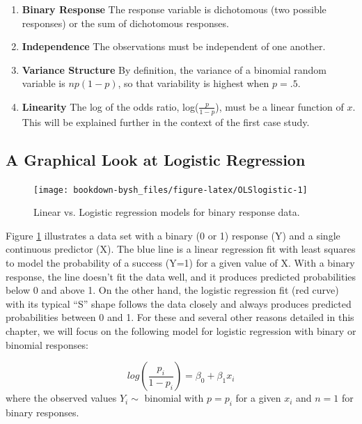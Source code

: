 \documentclass[
]{krantz}
\providecommand{\tightlist}{%
  \setlength{\itemsep}{0pt}\setlength{\parskip}{0pt}}
\begin{document}
\begin{enumerate}
\def\labelenumi{\arabic{enumi}.}
\tightlist
\item
  \textbf{Binary Response} The response variable is dichotomous (two possible responses) or the sum of dichotomous responses.
\item
  \textbf{Independence} The observations must be independent of one another.
\item
  \textbf{Variance Structure} By definition, the variance of a binomial random variable is \(np(1-p)\), so that variability is highest when \(p=.5\).
\item
  \textbf{Linearity} The log of the odds ratio, log(\(\frac{p}{1-p}\)), must be a linear function of \(x\). This will be explained further in the context of the first case study.
\end{enumerate}

\hypertarget{a-graphical-look-at-logistic-regression}{%
\subsection{A Graphical Look at Logistic Regression}\label{a-graphical-look-at-logistic-regression}}

\begin{figure}

{\centering \texttt{[image: bookdown-bysh\_files/figure-latex/OLSlogistic-1]} 

}

\caption{Linear vs. Logistic regression models for binary response data.}\label{fig:OLSlogistic}
\end{figure}

Figure \ref{fig:OLSlogistic} illustrates a data set with a binary (0 or 1) response (Y) and a single continuous predictor (X). The blue line is a linear regression fit with least squares to model the probability of a success (Y=1) for a given value of X. With a binary response, the line doesn't fit the data well, and it produces predicted probabilities below 0 and above 1. On the other hand, the logistic regression fit (red curve) with its typical ``S'' shape follows the data closely and always produces predicted probabilities between 0 and 1. For these and several other reasons detailed in this chapter, we will focus on the following model for logistic regression with binary or binomial responses:

\begin{equation*}
log(\frac{p_i}{1-p_i})=\beta_0+\beta_1 x_i
\end{equation*}
where the observed values \(Y_i \sim\) binomial with \(p=p_i\) for a given \(x_i\) and \(n=1\) for binary responses.
\end{document}
